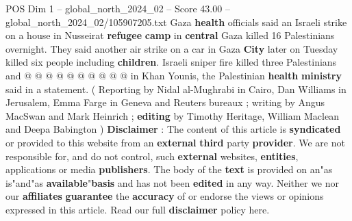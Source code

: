 \begin{textsample}{POS Dim 1 – global\_north\_2024\_02 – Score 43.00 – global\_north\_2024\_02/105907205.txt}
Gaza \textbf{health} officials said an Israeli strike on a house in Nusseirat \textbf{refugee} \textbf{camp} in \textbf{central} Gaza killed 16 Palestinians overnight.
They said another air strike on a car in Gaza \textbf{City} later on Tuesday killed six people including \textbf{children}.
Israeli sniper fire killed three Palestinians and @ @ @ @ @ @ @ @ @ @ in Khan Younis, the Palestinian \textbf{health} \textbf{ministry} said in a statement. ( Reporting by Nidal al-Mughrabi in Cairo, Dan Williams in Jerusalem, Emma Farge in Geneva and Reuters bureaux ; writing by Angus MacSwan and Mark Heinrich ; \textbf{editing} by Timothy Heritage, William Maclean and Deepa Babington ) \textbf{Disclaimer} : The content of this article is \textbf{syndicated} or provided to this website from an \textbf{external} \textbf{third} party \textbf{provider}.
We are not responsible for, and do not control, such \textbf{external} websites, \textbf{entities}, applications or media \textbf{publishers}.
The body of the \textbf{text} is provided on an"as is"and"as \textbf{available}"\textbf{basis} and has not been \textbf{edited} in any way.
Neither we nor our \textbf{affiliates} \textbf{guarantee} the \textbf{accuracy} of or endorse the views or opinions expressed in this article.
Read our full \textbf{disclaimer} policy here.

\end{textsample}
